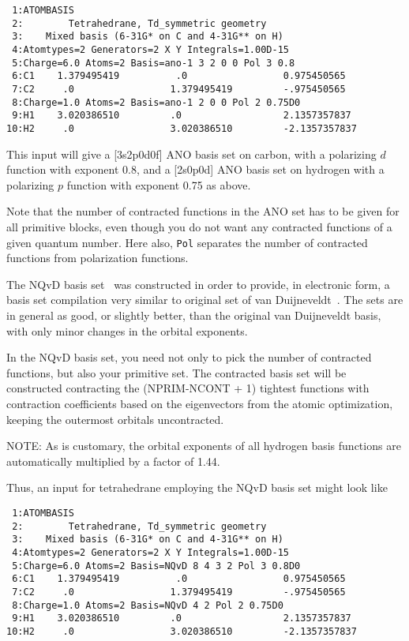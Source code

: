 \begin{verbatim}
 1:ATOMBASIS
 2:        Tetrahedrane, Td_symmetric geometry
 3:    Mixed basis (6-31G* on C and 4-31G** on H)
 4:Atomtypes=2 Generators=2 X Y Integrals=1.00D-15
 5:Charge=6.0 Atoms=2 Basis=ano-1 3 2 0 0 Pol 3 0.8
 6:C1    1.379495419          .0                 0.975450565
 7:C2     .0                 1.379495419         -.975450565
 8:Charge=1.0 Atoms=2 Basis=ano-1 2 0 0 Pol 2 0.75D0
 9:H1    3.020386510         .0                  2.1357357837
10:H2     .0                 3.020386510         -2.1357357837
\end{verbatim}

This input will give a [3s2p0d0f] ANO basis set
on carbon, with a
polarizing $d$ function with exponent 0.8, and a [2s0p0d] ANO basis
set on hydrogen with a polarizing $p$ function with exponent 0.75 as
above.

Note that the number of contracted functions in the ANO
set has to be
given for all primitive blocks, even though you do not want any
contracted functions of a given quantum number. Here also, {\tt Pol}
separates the number of contracted functions from polarization
functions.

The NQvD basis set~\cite{nqvdref} was constructed in order to provide,
in electronic form, a basis set compilation very similar to original
set of van Duijneveldt~\cite{fbvdibmrap}.
The sets are in general as good, or slightly better, than the original
van Duijneveldt basis, with only minor changes in the orbital
exponents.

In the NQvD basis set, you need not only to pick the number of
contracted functions, but also your primitive set. The contracted
basis set will be constructed contracting the (NPRIM-NCONT + 1)
tightest functions with contraction coefficients based on the
eigenvectors from the atomic optimization, keeping the outermost
orbitals uncontracted.

NOTE: As is customary, the orbital exponents of all hydrogen basis
functions are automatically multiplied by a factor of 1.44.

Thus, an input for tetrahedrane employing the NQvD basis set might
look like

\begin{verbatim}
 1:ATOMBASIS
 2:        Tetrahedrane, Td_symmetric geometry
 3:    Mixed basis (6-31G* on C and 4-31G** on H)
 4:Atomtypes=2 Generators=2 X Y Integrals=1.00D-15
 5:Charge=6.0 Atoms=2 Basis=NQvD 8 4 3 2 Pol 3 0.8D0
 6:C1    1.379495419          .0                 0.975450565
 7:C2     .0                 1.379495419         -.975450565
 8:Charge=1.0 Atoms=2 Basis=NQvD 4 2 Pol 2 0.75D0
 9:H1    3.020386510         .0                  2.1357357837
10:H2     .0                 3.020386510         -2.1357357837
\end{verbatim}


